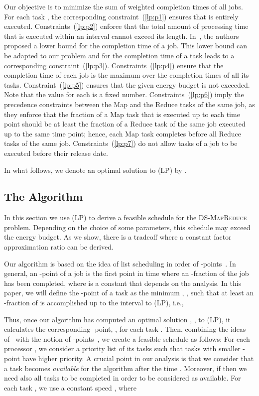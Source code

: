 \documentclass{llncs}
\newcommand{\dmr}{\textsc{DS-MapReduce}\xspace}
\begin{document}
Our objective is to minimize the sum of weighted completion times of all jobs.
For each task , the corresponding constraint~(\ref{lp:p1}) ensures that  is entirely executed.
Constraints~(\ref{lp:p2}) enforce that the total amount of processing time that is executed within an interval  cannot exceed its length.
In~\cite{SchulzS02}, the authors proposed a lower bound for the completion time of a job.
This lower bound can be adapted to our problem and for the completion time
of a task  leads to a corresponding constraint~(\ref{lp:p3}).
Constraints~(\ref{lp:p4}) ensure that the completion time of each job is the maximum over the completion times of all its tasks.
Constraint~(\ref{lp:p5}) ensures that the given energy budget is not exceeded.
Note that the value  for each  is a fixed number.
Constraints~(\ref{lp:p6}) imply the precedence constraints between the Map and the Reduce tasks of the same job,
as they enforce that the fraction of a Map task that is executed up to each time point
should be at least the fraction of a Reduce task of the same job executed up to the same time point;
hence, each Map task completes before all Reduce tasks of the same job.
Constraints~(\ref{lp:p7}) do not allow tasks of a job to be executed before their release date.


In what follows, we denote an optimal solution to (LP) by .

\subsection{The Algorithm}

In this section we use (LP) to derive a feasible schedule for the \dmr problem.
Depending on the choice of some parameters, this schedule may exceed the energy budget.
As we show, there is a tradeoff where a constant factor approximation ratio can be derived.

Our algorithm is based on the idea of list scheduling in order of -points~\cite{HallSSW97}.
In general, an -point of a job is the first point in time
where an -fraction of the job has been completed, where  is a constant that depends on the analysis.
In this paper, we will define the -point  of a task  as
the minimum , , such that at least an -fraction of  is accomplished up to the interval  to (LP), i.e.,

Thus, once our algorithm has computed an optimal solution , ,  to (LP),
it calculates the corresponding -point, , for each task .
Then, combining the ideas of~\cite{ChenKL12} with the notion of -points~\cite{HallSSW97}, we create a feasible schedule as follows:
For each processor , we consider a priority list  of its tasks such that tasks with smaller -point have higher priority.
A crucial point in our analysis is that we consider that a task 
becomes \emph{available} for the algorithm after the time .
Moreover, if  then we need also all tasks  to be completed in order  to be considered as available.
For each task , we use a constant speed , where
\end{document}
